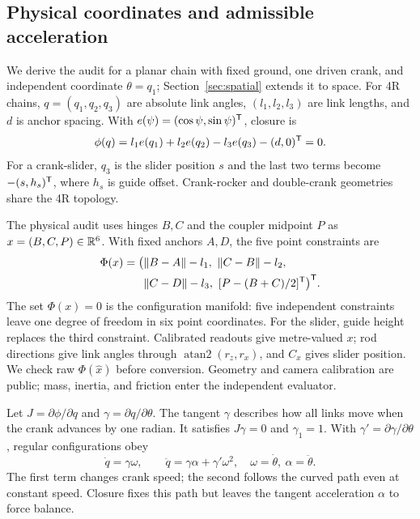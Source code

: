 \documentclass[10pt,twocolumn,letterpaper]{article}
\begin{document}
\subsection{Physical coordinates and admissible acceleration}
We derive the audit for a planar chain with fixed ground, one driven crank, and independent coordinate $\theta=q_1$; Section~\ref{sec:spatial} extends it to space. For 4R chains, $q=(q_1,q_2,q_3)$ are absolute link angles, $(l_1,l_2,l_3)$ are link lengths, and $d$ is anchor spacing. With $e(\psi)=(\cos\psi,\sin\psi)^{\mathsf T}$, closure is
\begin{equation}
\phi(q)=l_1e(q_1)+l_2e(q_2)-l_3e(q_3)-(d,0)^{\mathsf T}=0.
\label{eq:closure}
\end{equation}
For a crank-slider, $q_3$ is the slider position $s$ and the last two terms become $-(s,h_s)^{\mathsf T}$, where $h_s$ is guide offset. Crank-rocker and double-crank geometries share the 4R topology.

The physical audit uses hinges $B,C$ and the coupler midpoint $P$ as $x=(B,C,P)\in\mathbb{R}^6$. With fixed anchors $A,D$, the five point constraints are
\begin{equation}
\begin{aligned}
\Phi(x)=\bigl(&\|B-A\|-l_1,\ \|C-B\|-l_2,\\
&\|C-D\|-l_3,\ [P-(B+C)/2]^{\mathsf T}\bigr)^{\mathsf T}.
\end{aligned}
\label{eq:pointconstraints}
\end{equation}
The set $\Phi(x)=0$ is the configuration manifold: five independent constraints leave one degree of freedom in six point coordinates. For the slider, guide height replaces the third constraint. Calibrated readouts give metre-valued $x$; rod directions give link angles through $\operatorname{atan2}(r_z,r_x)$, and $C_x$ gives slider position. We check raw $\Phi(\hat x)$ before conversion. Geometry and camera calibration are public; mass, inertia, and friction enter the independent evaluator.

Let $J=\partial\phi/\partial q$ and $\gamma=\partial q/\partial\theta$. The tangent $\gamma$ describes how all links move when the crank advances by one radian. It satisfies $J\gamma=0$ and $\gamma_1=1$. With $\gamma'=\partial\gamma/\partial\theta$, regular configurations obey
\begin{equation}
\dot q=\gamma\omega,\qquad
\ddot q=\gamma\alpha+\gamma'\omega^2,
\quad \omega=\dot\theta,\ \alpha=\ddot\theta.
\label{eq:admissible}
\end{equation}
The first term changes crank speed; the second follows the curved path even at constant speed. Closure fixes this path but leaves the tangent acceleration $\alpha$ to force balance.
\end{document}

